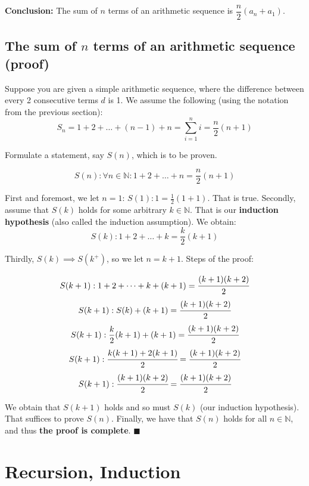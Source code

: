 \documentclass[10pt,a4paper]{article}
\begin{document}
\textbf{Conclusion:} The sum of $n$ terms of an arithmetic sequence is $\dfrac{n}{2} (a_{n} + a_{1})$.



\subsection{The sum of $n$ terms of an arithmetic sequence (proof)}

Suppose you are given a simple arithmetic sequence, where the difference between every 2 consecutive terms 
$d$ is 1. We assume the following (using the notation from the previous section): 
$$S_{n} = 1 + 2 + \dots + (n - 1) + n = \sum_{i=1}^{n} i = \frac{n}{2} (n + 1)$$

Formulate a statement, say $S(n)$, which is to be proven.

$$S(n): \forall n \in \mathbb{N}: 1 + 2 + \dots + n = \frac{n}{2} (n + 1)$$

First and foremost, we let $n=1$: $S(1): 1 = \frac{1}{2} (1 + 1)$. That is true. \linebreak  %
Secondly, assume that $S(k)$ holds for some arbitrary $k \in \mathbb{N}$.  %
That is our \textbf{induction hypothesis} (also called the induction assumption). We obtain:
$$S(k): 1 + 2 + \dots + k = \frac{k}{2} (k + 1)$$

Thirdly, $S(k) \implies S(k^{+})$, so we let $n=k+1$. Steps of the proof:  %

$$S(k + 1): 1 + 2 + \dots + k + (k + 1) = \cfrac{(k+1)(k+2)}{2}$$  %
$$S(k + 1): S(k) + (k + 1) = \cfrac{(k+1)(k+2)}{2}$$
$$S(k + 1): \frac{k}{2} (k + 1) + (k + 1) = \cfrac{(k+1)(k+2)}{2}$$
$$S(k + 1): \cfrac{k(k+1) + 2(k+1)}{2} = \cfrac{(k+1)(k+2)}{2}$$
$$S(k + 1): \cfrac{(k+1)(k+2)}{2} = \cfrac{(k+1)(k+2)}{2}$$

We obtain that $S(k+1)$ holds and so must $S(k)$ (our induction hypothesis). That suffices to prove $S(n)$.
Finally, we have that $S(n)$ holds for all $n \in \mathbb{N}$, and thus \textbf{the proof is complete}. $\blacksquare$ %


\section{Recursion, Induction}
\end{document}
